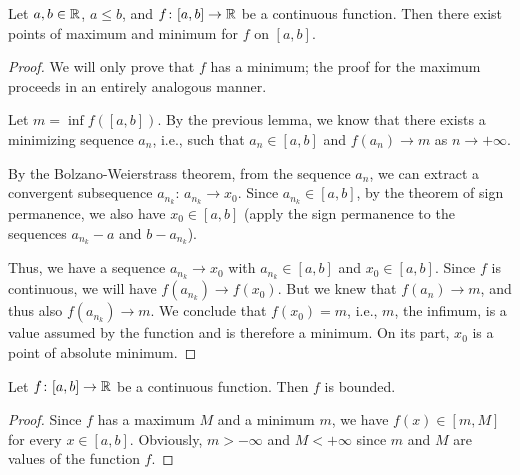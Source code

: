 \begin{theorem}[Weierstrass]%
\label{th:weierstrass}%
\mymark{***}%
%
%
%
%
Let $a,b\in {\mathbb R}$, $a\le b$, and $f\colon [a,b]\to {\mathbb R}$ be a continuous function.
Then there exist points of maximum and minimum for $f$ on $[a,b]$.
\end{theorem}
%
\begin{proof}
\mymark{***}%
We will only prove that $f$ has a minimum; the proof for the maximum proceeds in
an entirely analogous manner.

Let $m= \inf f([a,b])$.
By the previous lemma, we know that there exists a minimizing sequence $a_n$,
i.e., such that $a_n \in [a,b]$ and $f(a_n)\to m$ as $n\to +\infty$.

By the Bolzano-Weierstrass theorem, from the sequence $a_n$, we can extract a
convergent subsequence $a_{n_k}$: $a_{n_k} \to x_0$.
Since $a_{n_k} \in [a,b]$, by the theorem of sign permanence, we also have $x_0
\in [a,b]$ (apply the sign permanence to the sequences $a_{n_k}-a$ and
$b-a_{n_k}$).

Thus, we have a sequence $a_{n_k}\to x_0$ with $a_{n_k}\in [a,b]$ and $x_0 \in
[a,b]$. Since $f$ is continuous, we will have $f(a_{n_k}) \to f(x_0)$.
But we knew that $f(a_n)\to m$, and thus also $f(a_{n_k}) \to m$.
We conclude that $f(x_0) = m$, i.e., $m$, the infimum, is a value assumed by the
function and is therefore a minimum.
On its part, $x_0$ is a point of absolute minimum.
\end{proof}

\begin{corollary}
Let $f\colon [a,b]\to {\mathbb R}$ be a continuous function. Then $f$ is bounded.
\end{corollary}
\begin{proof}
Since $f$ has a maximum $M$ and a minimum $m$, we have $f(x)\in [m,M]$ for every
$x\in[a,b]$.
Obviously, $m>-\infty$ and $M<+\infty$ since $m$ and $M$ are values of the
function $f$.
\end{proof}

